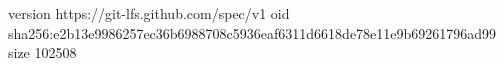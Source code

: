 version https://git-lfs.github.com/spec/v1
oid sha256:e2b13e9986257ec36b6988708c5936eaf6311d6618de78e11e9b69261796ad99
size 102508
